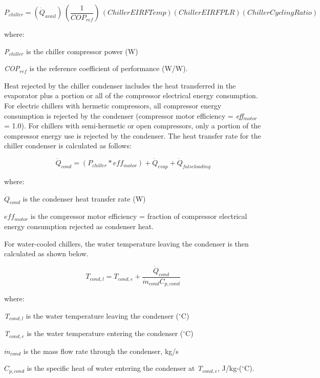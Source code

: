 \begin{equation}
{P_{chiller}} = \left( {{\dot{Q}_{avail}}} \right)\,\left( {\frac{1}{{CO{P_{ref}}}}} \right)\,\left( {ChillerEIRFTemp} \right)\left( {ChillerEIRFPLR} \right)\left( {ChillerCyclingRatio} \right)
\end{equation}

where:

\emph{P\(_{chiller}\)} is the chiller compressor power (W)

\emph{COP\(_{ref}\)} is the reference coefficient of performance (W/W).

Heat rejected by the chiller condenser includes the heat transferred in the evaporator plus a portion or all of the compressor electrical energy consumption. For electric chillers with hermetic compressors, all compressor energy consumption is rejected by the condenser (compressor motor efficiency = \emph{eff\(_{motor}\)} = 1.0). For chillers with semi-hermetic or open compressors, only a portion of the compressor energy use is rejected by the condenser. The heat transfer rate for the chiller condenser is calculated as follows:

\begin{equation}
{\dot{Q}_{cond}} = \left( {{P_{chiller}} * ef{f_{motor}}} \right) + {\dot{Q}_{evap}} + {\dot{Q}_{falseloading}}
\end{equation}

where:

\({\dot{Q}_{cond}}\) is the condenser heat transfer rate (W)

\(ef{f_{motor}}\) is the compressor motor efficiency = fraction of compressor electrical energy consumption rejected as condenser heat.

For water-cooled chillers, the water temperature leaving the condenser is then calculated as shown below.

\begin{equation} 
  T_{cond,l} = T_{cond,e} + \frac{\dot{Q}_{cond}}{\dot{m}_{cond}C_{p,cond}}
\end{equation}

where:

\emph{T\(_{cond,l}\)} is the water temperature leaving the condenser (\(^{\circ}\)C)

\emph{T\(_{cond,e}\)} is the water temperature entering the condenser (\(^{\circ}\)C)

\({\dot{m}_{cond}}\) is the mass flow rate through the condenser, kg/s

\({C_{p,cond}}\) is the specific heat of water entering the condenser at \emph{T\(_{cond,e}\)}, J/kg-(\(^{\circ}\)C).

